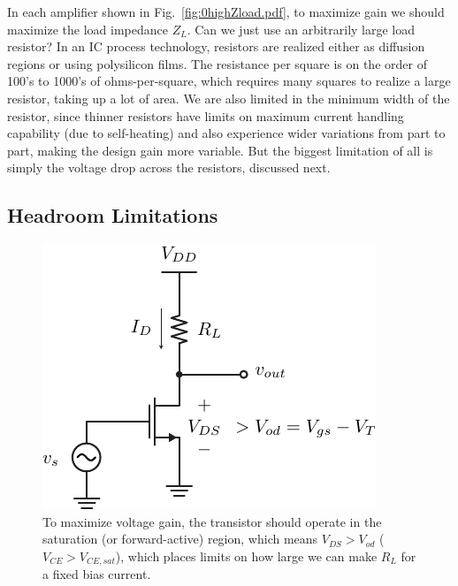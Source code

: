 In each amplifier shown in Fig.~\ref{fig:0highZload.pdf}, to maximize gain we should maximize the load impedance $Z_L$.   Can we just use an arbitrarily large load resistor?  In an IC process technology, resistors are realized either as diffusion regions or using polysilicon films.  The resistance per square is on the order of 100's to 1000's of ohms-per-square, which requires many squares to realize a large resistor, taking up a lot of area.  We are also limited in the minimum width of the resistor, since thinner resistors have limits on maximum current handling capability (due to self-heating) and also experience wider variations from part to part, making the design gain more variable.  But the biggest limitation of all is simply the voltage drop across the resistors, discussed next. 




\subsection{Headroom Limitations}



\begin{figure}[tb]
\begin{center}
\includegraphics[scale=1]{1cs_headroom.pdf}
\end{center}
\caption{To maximize voltage gain, the transistor should operate in the saturation (or forward-active) region, which means $V_{DS} > V_{od}$ ($V_{CE} > V_{CE,sat}$), which places limits on how large we can make $R_L$ for a fixed bias current.} \label{fig:1cs_headroom.pdf}
\end{figure}

